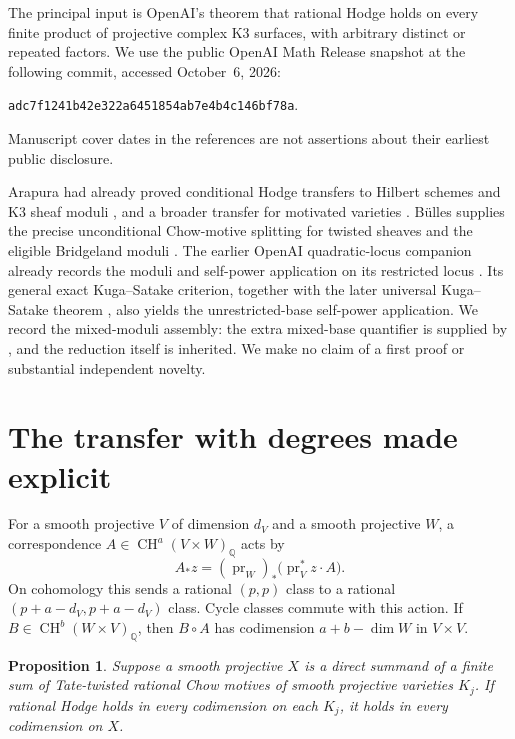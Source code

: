 \documentclass[11pt]{article}
\newtheorem{proposition}[theorem]{Proposition}
\newcommand{\Q}{\mathbb Q}
\newcommand{\CH}{\operatorname{CH}}
\begin{document}
\begin{samepage}
The principal input is OpenAI's theorem \cite[Theorem~1.1]{OpenAIMixed}
that rational Hodge holds on every finite product of projective complex
K3 surfaces, with arbitrary distinct or repeated factors. We use the
public OpenAI Math Release snapshot at the following commit, accessed
October~6, 2026:
\begin{center}
\texttt{adc7f1241b42e322a6451854ab7e4b4c146bf78a}.
\end{center}
Manuscript cover dates in the references are not assertions about
their earliest public disclosure.
\end{samepage}

Arapura had already proved conditional Hodge transfers to Hilbert schemes
and K3 sheaf moduli \cite[Theorems~5.4 and~5.7(3)]{ArapuraHodge}, and a
broader transfer for motivated varieties \cite[Lemma~4.2 and
Theorems~7.4, 7.8]{ArapuraMotivation}. B\"ulles supplies the precise
unconditional Chow-motive splitting for twisted sheaves and the eligible
Bridgeland moduli \cite[Theorem~0.1]{Bulles}. The earlier OpenAI
quadratic-locus companion already records the moduli and self-power
application on its restricted locus \cite[Corollary~9.5]{OpenAIQuadratic}.
Its general exact Kuga--Satake criterion, together with the later universal
Kuga--Satake theorem \cite{OpenAIKS}, also yields the unrestricted-base
self-power application. We record the mixed-moduli assembly: the extra
mixed-base quantifier is supplied by \cite{OpenAIMixed}, and the reduction
itself is inherited. We make no claim of a first proof or substantial
independent novelty.

\section{The transfer with degrees made explicit}

For a smooth projective $V$ of dimension $d_V$ and a smooth projective
$W$, a correspondence $A\in\CH^a(V\times W)_\Q$ acts by
\[
 A_*z=(\operatorname{pr}_W)_*
       \bigl(\operatorname{pr}_V^*z\cdot A\bigr).
\]
On cohomology this sends a rational $(p,p)$ class to a rational
$(p+a-d_V,p+a-d_V)$ class. Cycle classes commute with this action.
If $B\in\CH^b(W\times V)_\Q$, then $B\circ A$ has codimension
$a+b-\dim W$ in $V\times V$.

\begin{proposition}\label{prop:transfer}
Suppose a smooth projective $X$ is a direct summand of a finite sum of
Tate-twisted rational Chow motives of smooth projective varieties $K_j$.
If rational Hodge holds in every codimension on each $K_j$, it holds in
every codimension on $X$.
\end{proposition}
\end{document}
